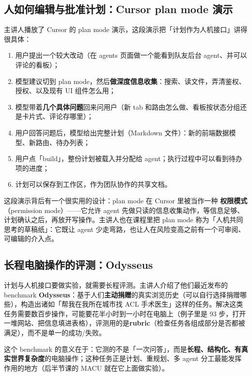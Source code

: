 \documentclass[a4paper]{article}
\begin{document}
\subsection{人如何编辑与批准计划：Cursor plan mode 演示}

主讲人播放了 Cursor 的 plan mode 演示，这段演示把「计划作为人机接口」讲得很具体：

\begin{enumerate}
\item 用户提出一个较大改动（在 agents 页面做一个能看到队友后台 agent、并可以评论的看板）；
\item 模型建议切到 plan mode，然后\textbf{做深度信息收集}：搜索、读文件，弄清鉴权、授权、以及现有 UI 组件怎么用；
\item 模型带着\textbf{几个具体问题}回来问用户（新 tab 和路由怎么做、看板按状态分组还是卡片式、评论存哪里）；
\item 用户回答问题后，模型给出完整计划（Markdown 文件）：新的前端数据模型、新路由、待办列表；
\item 用户点「build」，整份计划被载入并分配给 agent；执行过程中可以看到待办项的进度；
\item 计划可以保存到工作区，作为团队协作的共享文档。
\end{enumerate}

这段演示背后有一个很实用的设计：plan mode 在 Cursor 里被当作一种 \textbf{权限模式}（permission mode）——它允许 agent 先做只读的信息收集动作，等信息足够、计划确认之后，再放开写操作。主讲人也在课程里把 plan mode 称为「人机共同思考的草稿纸」：它既让 agent 少走弯路，也让人在风险变高之前有一个可审阅、可编辑的介入点。

\subsection{长程电脑操作的评测：Odysseus}

计划与人机接口要做实验，就需要长程评测。主讲人介绍了他们最近发布的 benchmark \textbf{Odysseus}：基于人们\textbf{主动捐赠}的真实浏览历史（可以自行选择捐赠哪些），构造出诸如「帮我在我所在城市找 ACL 手术医生」这样的任务。解决这类任务需要数百步操作，可能要花半小时到一小时在电脑上（例子里是 93 步，打开一堆网站、把信息填进表格），评测用的是\textbf{rubric}（检查任务各组成部分是否都被满足），而不是单一的成功/失败。

这个 benchmark 的意义在于：它测的不是「一次问答」，而是\textbf{长程、结构化、有真实世界复杂度}的电脑操作；这种任务正是计划、重规划、多 agent 分工最能发挥作用的地方（后半节课的 MACU 就在它上面做实验）。
\end{document}
